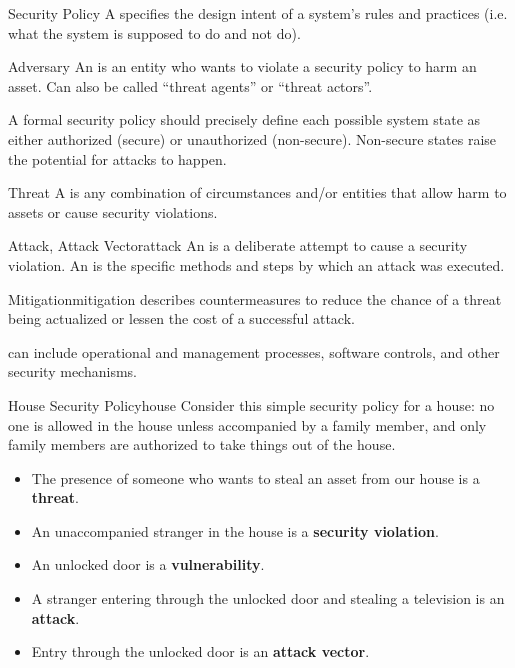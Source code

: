 \documentclass[code]{amznotes}
\begin{document}
\begin{dfnbox}{Security Policy}{}
    A  specifies the design intent of a system's rules and practices (i.e. what the system is supposed to do and not do).
\end{dfnbox}

\begin{dfnbox}{Adversary}{}
    An  is an entity who wants to violate a security policy to harm an asset. Can also be called ``threat agents'' or ``threat actors''.
\end{dfnbox}

A formal security policy should precisely define each possible system state as either authorized (secure) or unauthorized (non-secure). Non-secure states raise the potential for attacks to happen.

\begin{dfnbox}{Threat}{}
    A  is any combination of circumstances and/or entities that allow harm to assets or cause security violations.
\end{dfnbox}

\begin{dfnbox}{Attack, Attack Vector}{attack}
    An  is a deliberate attempt to cause a security violation. An  is the specific methods and steps by which an attack was executed.

\end{dfnbox}

\begin{dfnbox}{Mitigation}{mitigation}
     describes countermeasures to reduce the chance of a threat being actualized or lessen the cost of a successful attack.
\end{dfnbox}

 can include operational and management processes, software controls, and other security mechanisms.

\begin{exbox}{House Security Policy}{house}
    Consider this simple security policy for a house: no one is allowed in the house unless accompanied by a family member, and only family members are authorized to take things out of the house.
    \begin{itemize}[noitemsep]
        \item The presence of someone who wants to steal an asset from our house is a \textbf{threat}.
        \item An unaccompanied stranger in the house is a \textbf{security violation}.
        \item An unlocked door is a \textbf{vulnerability}.
        \item A stranger entering through the unlocked door and stealing a television is an \textbf{attack}.
        \item Entry through the unlocked door is an \textbf{attack vector}.
    \end{itemize}
\end{exbox}
\end{document}
